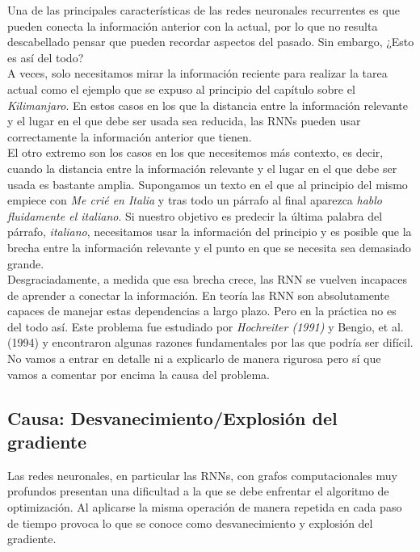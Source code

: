     Una de las principales características de las redes neuronales recurrentes es que pueden conecta la información anterior con la actual, por lo que no resulta descabellado pensar que pueden recordar aspectos del pasado. Sin embargo, ¿Esto es así del todo?\\
    
    A veces, solo necesitamos mirar la información reciente para realizar la tarea actual como el ejemplo que se expuso al principio del capítulo sobre el \textit{Kilimanjaro}. En estos casos en los que la distancia entre la información relevante y el lugar en el que debe ser usada sea reducida, las RNNs pueden usar correctamente la información anterior que tienen. \\
    
    El otro extremo son los casos en los que necesitemos más contexto, es decir, cuando la distancia entre la información relevante y el lugar en el que debe ser usada es bastante amplia. Supongamos un texto en el que al principio del mismo empiece con \textit{Me crié en Italia} y tras todo un párrafo al final aparezca \textit{hablo fluidamente el italiano}. Si nuestro objetivo es predecir la última palabra del párrafo, \textit{italiano}, necesitamos usar la información del principio y es posible que la brecha entre la información relevante y el punto en que se necesita sea demasiado grande. \\
    
    Desgraciadamente, a medida que esa brecha crece, las RNN se vuelven incapaces de aprender a conectar la información. En teoría las RNN son absolutamente capaces de manejar estas dependencias a largo plazo. Pero en la práctica no es del todo así. Este problema fue estudiado por \textit{Hochreiter (1991)} y Bengio, et al. (1994) \cite{schmidhuber1997long, pascanu2013difficulty} y encontraron algunas razones fundamentales por las que podría ser difícil. No vamos a entrar en detalle ni a explicarlo de manera rigurosa pero sí que vamos a comentar por encima la causa del problema. \\

\subsection{Causa: Desvanecimiento/Explosión del gradiente}


        Las redes neuronales, en particular las RNNs, con grafos computacionales muy profundos presentan una dificultad a la que se debe enfrentar el algoritmo de optimización. Al aplicarse la misma operación de manera repetida en cada paso de tiempo provoca lo que se conoce como desvanecimiento y explosión del gradiente. \\
        
